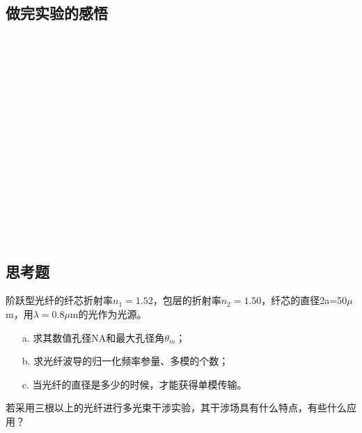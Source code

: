 \documentclass{zjureport}
\begin{document}
  \subsection{做完实验的感悟}
  	~\\
  ~\\
  ~\\
  ~\\
  ~\\
  ~\\
  ~\\
  ~\\
  ~\\
  ~\\
  ~\\
  ~\\
  ~\\
  ~\\
  ~\\
  \subsection{思考题}
  \begin{clause}
  	\item 阶跃型光纤的纤芯折射率$n_{1}=1.52$，包层的折射率$n_{2}=1.50$，纤芯的直径2a=50$\mu$m，用$\lambda=0.8\mu$m的光作为光源。
  	\begin{itemize}
  		\item[a.] 求其数值孔径NA和最大孔径角$\theta_{m}$；
  		\item[b.] 求光纤波导的归一化频率参量、多模的个数；
  		\item[c.] 当光纤的直径是多少的时候，才能获得单模传输。
  	\end{itemize}
  \item 若采用三根以上的光纤进行多光束干涉实验，其干涉场具有什么特点，有些什么应用？
  	~\\
  ~\\
  ~\\
  ~\\
  ~\\
  ~\\
  ~\\
  ~\\
  ~\\
  ~\\
  ~\\
  ~\\
  ~\\
  ~\\
  ~\\
  \end{clause}
  
\end{document}
